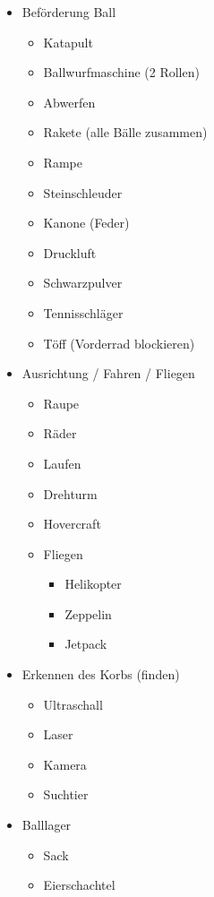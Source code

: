 \begin{itemize}
    \item Beförderung Ball
    \begin{itemize}
        \item Katapult
        \item Ballwurfmaschine (2 Rollen)
        \item Abwerfen
        \item Rakete (alle Bälle zusammen)
        \item Rampe
        \item Steinschleuder
        \item Kanone (Feder)
        \item Druckluft
        \item Schwarzpulver
        \item Tennisschläger
        \item Töff (Vorderrad blockieren)
    \end{itemize}
    \item Ausrichtung / Fahren / Fliegen
    \begin{itemize}
        \item Raupe
        \item Räder
        \item Laufen
        \item Drehturm
        \item Hovercraft
        \item Fliegen
        \begin{itemize}
            \item Helikopter
            \item Zeppelin
            \item Jetpack
        \end{itemize}
    \end{itemize}
    \item Erkennen des Korbs (finden)
    \begin{itemize}
        \item Ultraschall
        \item Laser
        \item Kamera
        \item Suchtier
    \end{itemize}
    \item Balllager
    \begin{itemize}
        \item Sack
        \item Eierschachtel

\end{itemize}
\end{itemize}
